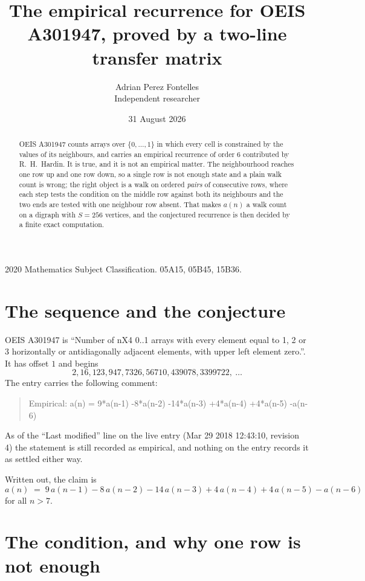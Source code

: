 \documentclass[11pt,a4paper]{article}
\title{The empirical recurrence for OEIS A301947, proved by a two-line transfer matrix}
\author{Adrian Perez Fontelles\\ \small Independent researcher}
\date{31 August 2026}
\theoremstyle{plain}
\theoremstyle{definition}
\begin{document}
\maketitle

\begin{abstract}
OEIS A301947 counts arrays over $\{0,\dots,1\}$ in which every cell is constrained by the
values of its neighbours, and carries an empirical recurrence of order $6$ contributed
by R.~H.~Hardin. It is true, and it is not an empirical matter. The neighbourhood reaches one
row up and one row down, so a single row is not enough state and a plain walk count
is wrong; the right object is a walk on ordered \emph{pairs} of consecutive rows, where
each step tests the condition on the middle row against both its neighbours and the two
ends are tested with one neighbour row absent. That makes $a(n)$ a walk count on a digraph
with $S=256$ vertices, and the conjectured recurrence is then decided by a finite exact
computation.
\end{abstract}

\noindent\small 2020 Mathematics Subject Classification. 05A15, 05B45, 15B36.\normalsize

\section{The sequence and the conjecture}

OEIS A301947 is ``Number of nX4 0..1 arrays with every element equal to 1, 2 or 3 horizontally or antidiagonally adjacent elements, with upper left element zero.''. It has offset $1$ and begins
\[
2, 16, 123, 947, 7326, 56710, 439078, 3399722,\ \dots
\]
The entry carries the following comment:
\begin{quote}\small
Empirical: a(n) = 9*a(n-1) -8*a(n-2) -14*a(n-3) +4*a(n-4) +4*a(n-5) -a(n-6)
\end{quote}
As of the ``Last modified'' line on the live entry (Mar 29 2018 12:43:10, revision 4) the statement is
still recorded as empirical, and nothing on the entry records it as settled either way.

Written out, the claim is
\begin{equation}\label{eq:conj}
a(n)\;=\;9\,a(n-1) - 8\,a(n-2) - 14\,a(n-3) + 4\,a(n-4) + 4\,a(n-5) - a(n-6)
\end{equation}
for all $n>7$.

\section{The condition, and why one row is not enough}
\end{document}
